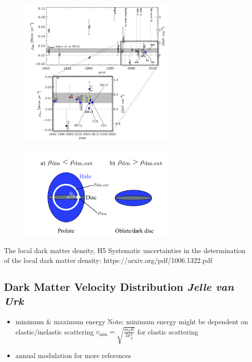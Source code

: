 \documentclass{article}
\begin{document}
\begin{figure}[h]
    \centering
    \includegraphics[width=0.7\textwidth]{Century.png}
    \caption{}
\end{figure}


\begin{figure}[h]
    \centering
    \includegraphics[width=0.7\textwidth]{Halo.png}
    \caption{}
\end{figure}


The local dark matter density, H5
Systematic uncertainties in the determination of the local dark matter density:
https://arxiv.org/pdf/1006.1322.pdf



\subsection{Dark Matter Velocity Distribution \small{\textit{Jelle van Urk}}} \label{DM_Velocity}

\begin{itemize}
    \item minimum \& maximum energy Note: minimum energy might be dependent on elastic/inelastic scattering $v_\text{min}=\sqrt{\frac{m_T E}{2\mu^2_\chi}}$ \cite{Kavanagh:2014rya} for elastic scattering
    \item annual modulation \cite{Undagoitia:2015gya} for more references
\end{itemize}
\end{document}
